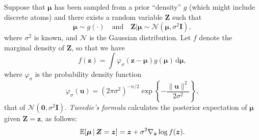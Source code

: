 \documentclass{article}
\theoremstyle{definition}
\begin{document}
Suppose that $\boldsymbol{\mu}$ has been sampled from a prior ``density'' $g$ (which might include discrete atoms) and there exists a random variable $\boldsymbol{Z}$ such that
\begin{equation*}
    \boldsymbol{\mu} \sim g(\cdot) \quad \text{and} \quad \boldsymbol{Z}|\boldsymbol{\mu} \sim \mathcal{N}(\boldsymbol{\mu}, \sigma^2 \boldsymbol{I}),
\end{equation*}
where $\sigma^2$ is known, and $\mathcal{N}$ is the Gaussian distribution. Let $f$ denote the marginal density of $\boldsymbol{Z}$, so that we have
\begin{equation*}
     f(\boldsymbol{z}) = \int \varphi_\sigma(\boldsymbol{z} - \boldsymbol{\mu})g(\boldsymbol{\mu}) \, \mathrm{d}\boldsymbol{\mu},
\end{equation*}
where $\varphi_\sigma$ is the probability density function
\begin{equation*}
    \varphi_\sigma(\boldsymbol{u}) = (2\pi\sigma^2)^{-n/2} \exp\left\{-\frac{\|\boldsymbol{u}\|^2}{2\sigma^2}\right\},
\end{equation*}
that of $\mathcal{N}(\boldsymbol{0}, \sigma^2 \boldsymbol{I})$. \textit{Tweedie's formula} calculates the posterior expectation of $\boldsymbol{\mu}$ given $\boldsymbol{Z} = \boldsymbol{z}$, as follows:
\begin{equation}\label{eq:tweedie}
     \mathbb{E}[\boldsymbol{\mu}\,|\,\boldsymbol{Z} = \boldsymbol{z}] = \boldsymbol{z} + \sigma^2 \nabla_{\boldsymbol{z}} \log f(\boldsymbol{z}).
\end{equation}
\end{document}
